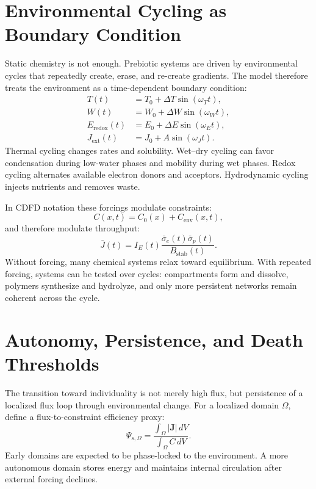 \documentclass[11pt,a4paper]{article}
\begin{document}
\section{Environmental Cycling as Boundary Condition}

Static chemistry is not enough. Prebiotic systems are driven by environmental cycles that repeatedly create, erase, and re-create gradients. The model therefore treats the environment as a time-dependent boundary condition:
\begin{align}
 T(t) &= T_0 + \Delta T \sin(\omega_T t),\\
 W(t) &= W_0 + \Delta W \sin(\omega_W t),\\
 E_{\mathrm{redox}}(t) &= E_0 + \Delta E \sin(\omega_E t),\\
 J_{\mathrm{ext}}(t) &= J_0 + A\sin(\omega_J t).
\end{align}
Thermal cycling changes rates and solubility. Wet--dry cycling can favor condensation during low-water phases and mobility during wet phases. Redox cycling alternates available electron donors and acceptors. Hydrodynamic cycling injects nutrients and removes waste.

In CDFD notation these forcings modulate constraints:
\begin{equation}
 C(x,t) = C_0(x) + C_{\mathrm{env}}(x,t),
\end{equation}
and therefore modulate throughput:
\begin{equation}
 \bar{J}(t) =
 I_E(t)\frac{\bar{\sigma}_e(t)\bar{\sigma}_p(t)}{B_{\mathrm{stab}}(t)}.
\end{equation}
Without forcing, many chemical systems relax toward equilibrium. With repeated forcing, systems can be tested over cycles: compartments form and dissolve, polymers synthesize and hydrolyze, and only more persistent networks remain coherent across the cycle.

\section{Autonomy, Persistence, and Death Thresholds}

The transition toward individuality is not merely high flux, but persistence of a localized flux loop through environmental change. For a localized domain $\Omega$, define a flux-to-constraint efficiency proxy:
\begin{equation}
 \Psi_{s,\Omega} =
 \frac{\int_{\Omega} |\bm{J}|\,dV}
 {\int_{\Omega} C\,dV}.
\end{equation}
Early domains are expected to be phase-locked to the environment. A more autonomous domain stores energy and maintains internal circulation after external forcing declines.
\end{document}
